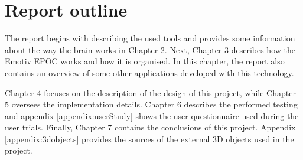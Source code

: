 \section{Report outline}

The report begins with describing the used tools and provides some information about the way the brain works in Chapter 2. Next, Chapter 3 describes how the Emotiv EPOC works and how it is organised. In this chapter, the report also contains an overview of some other applications developed with this technology.

Chapter 4 focuses on the description of the design of this project, while Chapter 5 oversees the implementation details. Chapter 6 describes the performed testing and appendix \ref{appendix:userStudy} shows the user questionnaire used during the user trials. Finally, Chapter 7 contains the conclusions of this project. Appendix \ref{appendix:3dobjects} provides the sources of the external 3D objects used in the project.